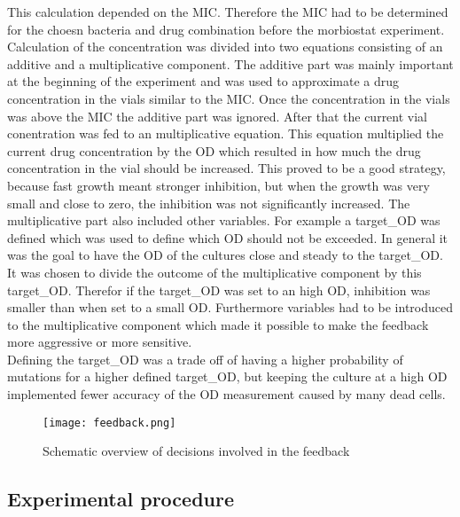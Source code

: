 This calculation depended on the MIC. Therefore the MIC had to be determined for the choesn bacteria and drug combination before the morbiostat experiment. Calculation of the concentration was divided into two equations consisting of an additive and a multiplicative component. The additive part was mainly important at the beginning of the experiment and was used to approximate a drug concentration in the vials similar to the MIC. Once the concentration in the vials was above the MIC the additive part was ignored. After that the current vial conentration was fed to an multiplicative equation. This equation multiplied the current drug concentration by the \textDelta OD which resulted in how much the drug concentration in the vial should be increased. This proved to be a good strategy, because fast growth meant stronger inhibition, but when the growth was very small and close to zero, the inhibition was not significantly increased. The multiplicative part also included other variables. For example a target\_OD was defined which was used to define which OD should not be exceeded. In general it was the goal to have the OD of the cultures close and steady to the target\_OD. \\
It was chosen to divide the outcome of the multiplicative component by this target\_OD. Therefor if the target\_OD was set to an high OD, inhibition was smaller than when set to a small OD. Furthermore variables had to be introduced to the multiplicative component which made it possible to make the feedback more aggressive or more sensitive.\\
Defining the target\_OD was a trade off of having a higher probability of mutations for a higher defined target\_OD, but keeping the culture at a high OD implemented fewer accuracy of the OD measurement caused by many dead cells.  


\begin{figure}
	\texttt{[image: feedback.png]}
	\caption{Schematic overview of decisions involved in the feedback}
	\label{figure:feedback}
\end{figure}

\subsection{Experimental procedure}
